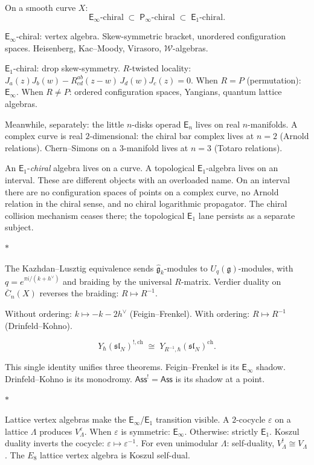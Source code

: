 \documentclass[11pt]{article}
\newcommand{\cW}{\mathcal{W}}
\newcommand{\fg}{\mathfrak{g}}
\newcommand{\fsl}{\mathfrak{sl}}
\newcommand{\Ass}{\mathsf{Ass}}
\newcommand{\Eone}{\mathsf{E}_1}
\newcommand{\Einf}{\mathsf{E}_{\infty}}
\newcommand{\Pinf}{\mathsf{P}_{\infty}}
\newcommand{\sep}{\bigskip\begin{center}$*$\end{center}\medskip}
\begin{document}
On a smooth curve $X$:
\[
\Einf\text{-chiral}
\;\subset\; \Pinf\text{-chiral}
\;\subset\; \Eone\text{-chiral}.
\]

$\Einf$-chiral: vertex algebra.  Skew-symmetric bracket,
unordered configuration spaces.  Heisenberg, Kac--Moody,
Virasoro, $\cW$-algebras.

$\Eone$-chiral: drop skew-symmetry.  $R$-twisted locality:
$J_a(z) J_b(w) - R^{ab}_{cd}(z{-}w)\, J_d(w) J_c(z) = 0$.
When $R = P$ (permutation): $\Einf$.  When $R \neq P$: ordered
configuration spaces, Yangians, quantum lattice algebras.

Meanwhile, separately: the little $n$-disks operad $\mathsf{E}_n$
lives on real $n$-manifolds.  A complex curve is real
$2$-dimensional: the chiral bar complex lives at $n = 2$ (Arnold
relations).  Chern--Simons on a $3$-manifold lives at $n = 3$
(Totaro relations).

An $\Eone$-\emph{chiral} algebra lives on a curve.  A topological
$\Eone$-algebra lives on an interval.  These are different objects
with an overloaded name.  On an interval there are no configuration
spaces of points on a complex curve, no Arnold relation in the
chiral sense, and no chiral logarithmic propagator.  The chiral
collision mechanism ceases there; the topological $\Eone$ lane
persists as a separate subject.

\sep

The Kazhdan--Lusztig equivalence sends $\widehat{\fg}_k$-modules
to $U_q(\fg)$-modules, with $q = e^{\pi i/(k+h^\vee)}$ and
braiding by the universal $R$-matrix.  Verdier duality on
$\overline{C}_n(X)$ reverses the braiding: $R \mapsto R^{-1}$.

Without ordering: $k \mapsto -k - 2h^\vee$ (Feigin--Frenkel).
With ordering: $R \mapsto R^{-1}$ (Drinfeld--Kohno).

\[
Y_\hbar(\fsl_N)^{!,\mathrm{ch}}
\;\cong\;
Y_{R^{-1},\hbar}(\fsl_N)^{\mathrm{ch}}.
\]

This single identity unifies three theorems.  Feigin--Frenkel is
its $\Einf$ shadow.  Drinfeld--Kohno is its monodromy.
$\Ass^! = \Ass$ is its shadow at a point.

\sep

Lattice vertex algebras make the $\Einf$/$\Eone$ transition
visible.  A $2$-cocycle $\varepsilon$ on a lattice $\Lambda$
produces $V_\Lambda^\varepsilon$.  When $\varepsilon$ is symmetric:
$\Einf$.  Otherwise: strictly $\Eone$.  Koszul duality inverts the
cocycle: $\varepsilon \mapsto \varepsilon^{-1}$.  For even
unimodular $\Lambda$: self-duality, $V_\Lambda^! \cong V_\Lambda$.
The $E_8$ lattice vertex algebra is Koszul self-dual.
\end{document}
